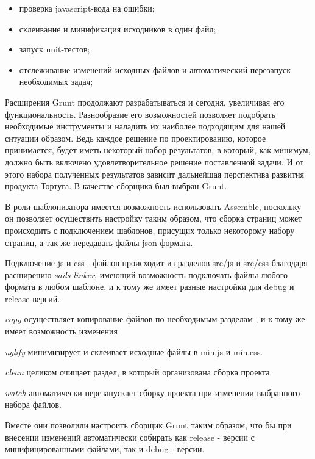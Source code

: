\begin{itemize}
  \item проверка javascript-кода на ошибки;
  \item склеивание и минификация исходников в один файл;
  \item запуск unit-тестов;
  \item отслеживание изменений исходных файлов и автоматический перезапуск необходимых задач;
\end{itemize}


Расширения Grunt продолжают разрабатываться и сегодня, увеличивая его функциональность. Разнообразие его возможностей позволяет подобрать необходимые инструменты и наладить их наиболее подходящим для нашей ситуации образом. Ведь каждое решение по проектированию, которое принимается, будет иметь некоторый набор результатов, в который, как минимум, должно быть включено удовлетворительное решение поставленной задачи. И от этого набора полученных результатов зависит дальнейшая перспектива развития продукта Тортуга. В качестве сборщика был выбран Grunt.

В роли шаблонизатора имеется возможность использовать Assemble, поскольку он позволяет осуществить настройку  таким образом, что сборка страниц может происходить с подключением шаблонов, присущих только некоторому набору страниц, а так же передавать файлы json формата.

Подключение js и css - файлов происходит из разделов src/js и src/css благодаря расширению \textit{sails-linker}, имеющий возможность подключать файлы любого формата в любом шаблоне, и к тому же имеет разные настройки для debug и release версий.

\textit{copy} осуществляет копирование файлов по необходимым разделам , и к тому же имеет возможность изменения 

\textit{uglify} минимизирует и склеивает исходные файлы в min.js и min.css.

\textit{clean} целиком очищает раздел, в который организована сборка проекта.

\textit{watch} автоматически перезапускает сборку проекта при изменении выбранного набора файлов.


Вместе они позволили настроить сборщик Grunt таким образом, что бы при внесении изменений автоматически собирать как release - версии с минифицированными файлами, так и debug - версии.


